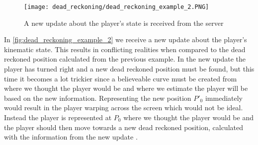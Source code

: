 \begin{figure}[H]
    \centering
    \texttt{[image: dead\_reckoning/dead\_reckoning\_example\_2.PNG]}
    \caption{A new update about the player's state is received from the server}
    \label{fig:dead_reckoning_example_2}
\end{figure}
In \autoref{fig:dead_reckoning_example_2} we receive a new update about the player's kinematic state. 
This results in conflicting realities when compared to the dead reckoned position calculated from the previous example. 
In the new update the player has turned right and a new dead reckoned position must be found, but this time it becomes a lot trickier since a believeable curve must be created from where we thought the player would be and where we estimate the player will be based on the new information. Representing the new position $P'_0$ immediately would result in the player warping across the screen which would not be ideal. Instead the player is represented at $ P_0 $ where we thought the player would be and the player should then move towards a new dead reckoned position, calculated with the information from the new update \autocite{DeadReckoning}.


